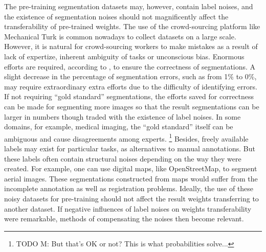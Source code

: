 

The pre-training segmentation datasets may, however, contain label noises, and the existence of segmentation noises should not magnificently affect the transferability of pre-trained weights.
The use of the crowd-sourcing platform like Mechanical Turk is common nowadays to collect datasets on a large scale.
However, it is natural for crowd-sourcing workers to make mistakes as a result of lack of expertize, inherent ambiguity of tasks or unconscious bias.
Enormous efforts are required, according to \cite{lin2014microsoft,everingham2015pascal}, to ensure the correctness of segmentations.
A slight decrease in the percentage of segmentation errors, such as from 1\% to 0\%, may require extraordinary extra efforts due to the difficulty of identifying errors.
If not requiring ``gold standard'' segmentations, the efforts saved for correctness can be made for segmenting more images so that the result segmentations can be larger in numbers though traded with the existence of label noises.
In some domains, for example, medical imaging, the ``gold standard'' itself can be ambiguous and cause disagreements among experts.
\footnote{TODO M: But that's OK or not?  This is what probabilities solve...}
Besides, freely available labels may exist for particular tasks, as alternatives to manual annotations.
But these labels often contain structural noises depending on the way they were created.
For example, one can use digital maps, like OpenStreetMap, to segment aerial images.
These segmentations constructed from maps would suffer from the incomplete annotation as well as registration problems.\cite{mnih2012learning}
Ideally, the use of these noisy datasets for pre-training should not affect the result weights transferring to another dataset.
If negative influences of label noises on weights transferability were remarkable, methods of compensating the noises then become relevant.


